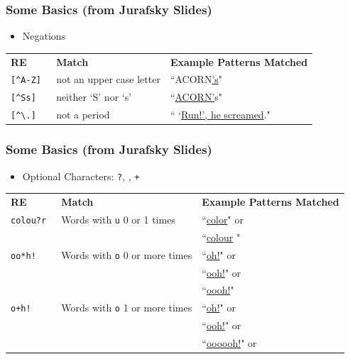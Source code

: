 \documentclass{beamer}
\begin{document}
\begin{frame}
\frametitle{Some Basics (from Jurafsky Slides) } 
\begin{itemize}
\item Negations 
\end{itemize}
\begin{center}
\scriptsize
\begin{tabular}{lll}
\textbf{RE} & \textbf{Match} & \textbf{Example Patterns Matched}\\
{\tt [\^{}A-Z] } & not an upper case letter &  ``ACORN\alert{\underline{'}\underline{s}}" \\
{\tt[\^{}Ss] } & neither `S' nor `s' & ``\alert{\underline{ACORN'}}s" \\
{\tt[\^{}\textbackslash.] } & not a period & `` `\underline{Run!', he screamed}." \\
\end{tabular}
\end{center}
\end{frame}

\begin{frame}
\frametitle{Some Basics (from Jurafsky Slides) } 
\begin{itemize}
\item Optional Characters: {\tt ?}, {\tt *}, {\tt +} 
\end{itemize}
\begin{center}
\scriptsize
\begin{tabular}{lll}
\textbf{RE} & \textbf{Match} & \textbf{Example Patterns Matched}\\
{\tt colou?r } &  Words with {\tt u}  0 or 1 times& ``\underline{color}"  or \\
                   &                                & ``\underline{colour} " \\
{\tt oo*h!}     & Words with {\tt o}  0 or more times & ``\underline{oh!}" or \\
                      &                                                   &   ``\underline{ooh!}" or \\
                       &                                                   &   ``\underline{oooh!}" \\ 
{\tt o+h!} &   Words with {\tt o} 1 or more times & ``\underline{oh!}" or \\
  &                                                   &   ``\underline{ooh!}" or \\
    &                                                   &   ``\underline{oooooh!}" or \\                       
\end{tabular}
\end{center}
\end{frame}
\end{document}
